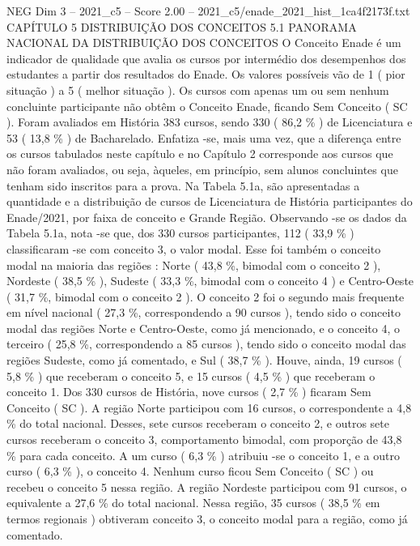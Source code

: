 \begin{textsample}{NEG Dim 3 – 2021\_c5 – Score 2.00 – 2021\_c5/enade\_2021\_hist\_1ca4f2173f.txt}  \label{ex:f3_neg_198}
CAPÍTULO 5 DISTRIBUIÇÃO DOS CONCEITOS 5.1 PANORAMA NACIONAL DA DISTRIBUIÇÃO DOS CONCEITOS O Conceito Enade é um indicador de qualidade que avalia os cursos por intermédio dos desempenhos dos estudantes a partir dos resultados do Enade.
Os valores possíveis vão de 1 ( pior situação ) a 5 ( melhor situação ).
Os cursos com apenas um ou sem nenhum concluinte participante não obtêm o Conceito Enade, ficando Sem Conceito ( SC ).
Foram avaliados em História 383 cursos, sendo 330 ( 86,2 \% ) de Licenciatura e 53 ( 13,8 \% ) de Bacharelado.
Enfatiza -se, mais uma vez, que a diferença entre os cursos tabulados neste capítulo e no Capítulo 2 corresponde aos cursos que não foram avaliados, ou seja, àqueles, em princípio, sem alunos concluintes que tenham sido inscritos para a prova.
Na Tabela 5.1a, são apresentadas a quantidade e a distribuição de cursos de Licenciatura de História participantes do Enade/2021, por faixa de conceito e Grande Região.
Observando -se os dados da Tabela 5.1a, nota -se que, dos 330 cursos participantes, 112 ( 33,9 \% ) classificaram -se com conceito 3, o valor modal.
Esse foi também o conceito modal na maioria das regiões : Norte ( 43,8 \%, bimodal com o conceito 2 ), Nordeste ( 38,5 \% ), Sudeste ( 33,3 \%, bimodal com o conceito 4 ) e Centro-Oeste ( 31,7 \%, bimodal com o conceito 2 ).
O conceito 2 foi o segundo mais frequente em nível nacional ( 27,3 \%, correspondendo a 90 cursos ), tendo sido o conceito modal das regiões Norte e Centro-Oeste, como já mencionado, e o conceito 4, o terceiro ( 25,8 \%, correspondendo a 85 cursos ), tendo sido o conceito modal das regiões Sudeste, como já comentado, e Sul ( 38,7 \% ).
Houve, ainda, 19 cursos ( 5,8 \% ) que receberam o conceito 5, e 15 cursos ( 4,5 \% ) que receberam o conceito 1.
Dos 330 cursos de História, nove cursos ( 2,7 \% ) ficaram Sem Conceito ( SC ).
A região Norte participou com 16 cursos, o correspondente a 4,8 \% do total nacional.
Desses, sete cursos receberam o conceito 2, e outros sete cursos receberam o conceito 3, comportamento bimodal, com proporção de 43,8 \% para cada conceito.
A um curso ( 6,3 \% ) atribuiu -se o conceito 1, e a outro curso ( 6,3 \% ), o conceito 4.
Nenhum curso ficou Sem Conceito ( SC ) ou recebeu o conceito 5 nessa região.
A região Nordeste participou com 91 cursos, o equivalente a 27,6 \% do total nacional.
Nessa região, 35 cursos ( 38,5 \% em termos regionais ) obtiveram conceito 3, o conceito modal para a região, como já comentado.

\end{textsample}
